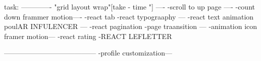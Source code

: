 task:
-------------
"grid layout wrap"[take - time "]
----
-scroll to up page ----
-count down frammer motion----
-react tab 
-react typograaphy ---
-react text animation  poulAR INFULENCER ---
-react pagination 
-page  traansition ---
-animation icon framer motion---
-react rating 
-REACT LEFLETTER  

---------------------------------------
-profile customization---

